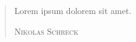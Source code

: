 \section*{}
\begin{quote}
	Lorem ipsum dolorem sit amet.
	
	\begin{flushright}
		\textsc{Nikolas Schreck}
	\end{flushright}
\end{quote}

